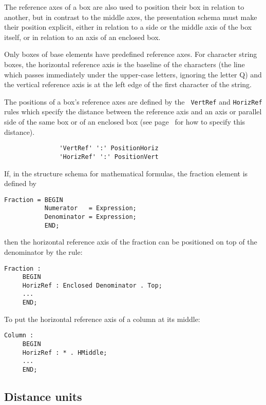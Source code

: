 The reference axes of a box are also used to position their box in
relation to another, but in contrast to the middle axes, the
presentation schema must make their position explicit, either in
relation to a side or the middle axis of the box itself, or in
relation to an axis of an enclosed box.

Only boxes of base elements have predefined reference axes.  For
character string boxes, the horizontal reference axis is the baseline
of the characters (the line which passes immediately under the
upper-case letters, ignoring the letter Q) and the vertical reference
axis is at the left edge of the first character of the string.

The positions of a box's reference axes are defined by the {\tt
VertRef} and {\tt HorizRef} rules which specify the distance between
the reference axis and an axis or parallel side of the same box or of
an enclosed box (see page~\pageref{distance} for how to specify this
distance).

\begin{verbatim}
               'VertRef' ':' PositionHoriz
               'HorizRef' ':' PositionVert
\end{verbatim}

\begin{example}
If, in the structure schema for mathematical formulas, the fraction
element is defined by

\begin{verbatim}
Fraction = BEGIN
           Numerator   = Expression;
           Denominator = Expression;
           END;
\end{verbatim}
then the horizontal reference axis of the fraction can be positioned
on top of the denominator by the rule:

\begin{verbatim}
Fraction :
     BEGIN
     HorizRef : Enclosed Denominator . Top;
     ...
     END;
\end{verbatim}
To put the horizontal reference axis of a column at its middle:

\begin{verbatim}
Column :
     BEGIN
     HorizRef : * . HMiddle;
     ...
     END;
\end{verbatim}
\end{example}

\subsection{Distance units}
\label{unites}

